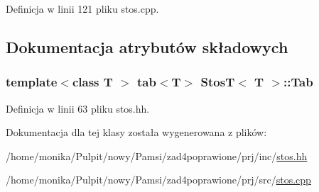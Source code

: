 \-Definicja w linii 121 pliku stos.\-cpp.



\subsection{\-Dokumentacja atrybutów składowych}
\hypertarget{class_stos_t_a81a86528f33fe2688b586fdf7eb0db4b}{
\subsubsection[{\-Tab}]{\setlength{\rightskip}{0pt plus 5cm}template$<$class T $>$ {\bf tab}$<$\-T$>$ {\bf \-Stos\-T}$<$ \-T $>$\-::{\bf \-Tab}}}\label{class_stos_t_a81a86528f33fe2688b586fdf7eb0db4b}


\-Definicja w linii 63 pliku stos.\-hh.



\-Dokumentacja dla tej klasy została wygenerowana z plików\-:\begin{DoxyCompactItemize}
\item 
/home/monika/\-Pulpit/nowy/\-Pamsi/zad4poprawione/prj/inc/\hyperlink{stos_8hh}{stos.\-hh}\item 
/home/monika/\-Pulpit/nowy/\-Pamsi/zad4poprawione/prj/src/\hyperlink{stos_8cpp}{stos.\-cpp}\end{DoxyCompactItemize}
